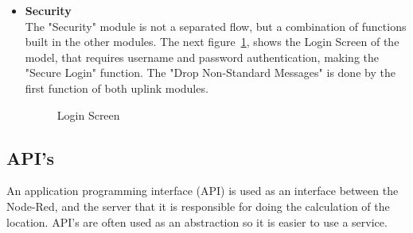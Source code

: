 \begin{itemize}
   \item \textbf{Security} \\
    The "Security" module is not a separated flow, but a combination of functions built in the other modules. The next figure~\ref{fig:Secu}, shows the Login Screen of the model, that requires username and password authentication, making the "Secure Login" function. The "Drop Non-Standard Messages" is done by the first function of both uplink modules.

 \begin{figure}[htbp]
  \centering
  \caption{Login Screen}
  \label{fig:Secu}
\end{figure}
\end{itemize}





\newpage

\subsection{API's }%
\label{sec:api}
An application programming interface (API) is used as an interface between the Node-Red, and the server that it is responsible for doing the calculation of the location. API's are often used as an abstraction so it is easier to use a service.

